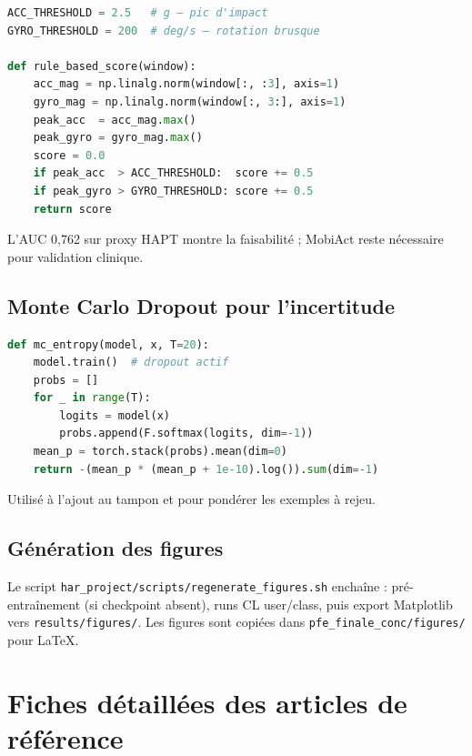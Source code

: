 \documentclass[a4paper,12pt]{report}
\begin{document}
\begin{lstlisting}[language=Python,caption={Règles heuristiques (\texttt{fall\_detector.py}, extrait)},label=lst:fall]
ACC_THRESHOLD = 2.5   # g — pic d'impact
GYRO_THRESHOLD = 200  # deg/s — rotation brusque

def rule_based_score(window):
    acc_mag = np.linalg.norm(window[:, :3], axis=1)
    gyro_mag = np.linalg.norm(window[:, 3:], axis=1)
    peak_acc  = acc_mag.max()
    peak_gyro = gyro_mag.max()
    score = 0.0
    if peak_acc  > ACC_THRESHOLD:  score += 0.5
    if peak_gyro > GYRO_THRESHOLD: score += 0.5
    return score
\end{lstlisting}

L'AUC 0,762 sur proxy HAPT montre la faisabilité ; MobiAct reste nécessaire
pour validation clinique.

\section{Monte Carlo Dropout pour l'incertitude}

\begin{lstlisting}[language=Python,caption={Estimation entropique (\texttt{uncertainty\_replay.py})},label=lst:mc]
def mc_entropy(model, x, T=20):
    model.train()  # dropout actif
    probs = []
    for _ in range(T):
        logits = model(x)
        probs.append(F.softmax(logits, dim=-1))
    mean_p = torch.stack(probs).mean(dim=0)
    return -(mean_p * (mean_p + 1e-10).log()).sum(dim=-1)
\end{lstlisting}

Utilisé à l'ajout au tampon et pour pondérer les exemples à rejeu.

\section{Génération des figures}

Le script \texttt{har\_project/scripts/regenerate\_figures.sh} enchaîne :
pré-entraînement (si checkpoint absent), runs CL user/class, puis export Matplotlib
vers \texttt{results/figures/}. Les figures sont copiées dans
\texttt{pfe\_finale\_conc/figures/} pour LaTeX.

\FloatBarrier



\chapter{Fiches détaillées des articles de référence}
\label{app:fiches}
\end{document}
